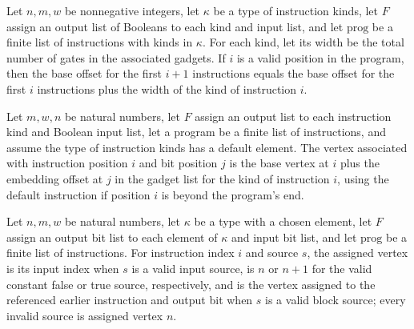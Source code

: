 \begin{theorem}
\label{BoolCircuit.progBase_succ}
\leanok
{}
Let $n,m,w$ be nonnegative integers, let $\kappa$ be a type of instruction kinds, let
$F$ assign an output list of Booleans to each kind and input list, and let
$\mathrm{prog}$ be a finite list of instructions with kinds in $\kappa$. For each kind,
let its width be the total number of gates in the associated gadgets. If $i$ is a valid
position in the program, then the base offset for the first $i+1$ instructions equals
the base offset for the first $i$ instructions plus the width of the kind of instruction
$i$.
\end{theorem}

\begin{definition}
\label{BoolCircuit.progVertex}
\leanok
{}
Let $m,w,n$ be natural numbers, let $F$ assign an output list to each instruction kind
and Boolean input list, let a program be a finite list of instructions, and assume the
type of instruction kinds has a default element. The vertex associated with instruction
position $i$ and bit position $j$ is the base vertex at $i$ plus the embedding offset at
$j$ in the gadget list for the kind of instruction $i$, using the default instruction if
position $i$ is beyond the program's end.
\end{definition}

\begin{definition}
\label{BoolCircuit.srcVertex}
\leanok
{}
Let $n,m,w$ be natural numbers, let $\kappa$ be a type with a chosen element, let $F$
assign an output bit list to each element of $\kappa$ and input bit list, and let
$\mathrm{prog}$ be a finite list of instructions. For instruction index $i$ and source $s$, the
assigned vertex is its input index when $s$ is a valid input source, is $n$ or $n+1$ for
the valid constant false or true source, respectively, and is the vertex assigned to the
referenced earlier instruction and output bit when $s$ is a valid block source; every
invalid source is assigned vertex $n$.
\end{definition}

